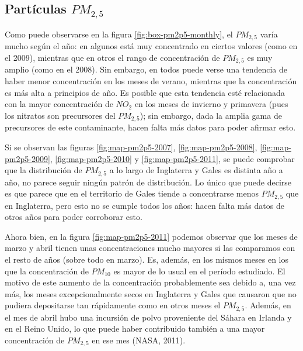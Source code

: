 \documentclass[12pt]{article}
\begin{document}
\subsection*{Partículas \textbf{\texorpdfstring{$PM_{2,5}$}{PM2,5}}}
%

Como puede observarse en la figura \ref{fig:box-pm2p5-monthly}, el $PM_{2,5}$ varía mucho según el año: en algunos está muy concentrado en ciertos valores (como en el 2009), mientras que en otros el rango de concentración de $PM_{2,5}$ es muy amplio (como en el 2008). Sin embargo, en todos puede verse una tendencia de haber menor concentración en los meses de verano, mientras que la concentración es más alta a principios de año. Es posible que esta tendencia esté relacionada con la mayor concentración de $NO_{2}$ en los meses de invierno y primavera (pues los nitratos son precursores del $PM_{2,5}$); sin embargo, dada la amplia gama de precursores de este contaminante, hacen falta más datos para poder afirmar esto.

Si se observan las figuras \ref{fig:map-pm2p5-2007}, \ref{fig:map-pm2p5-2008}, \ref{fig:map-pm2p5-2009}, \ref{fig:map-pm2p5-2010} y \ref{fig:map-pm2p5-2011}, se puede comprobar que la distribución de $PM_{2,5}$ a lo largo de Inglaterra y Gales es distinta año a año, no parece seguir ningún patrón de distribución. Lo único que puede decirse es que parece que en el territorio de Gales tiende a concentrarse menos $PM_{2,5}$ que en Inglaterra, pero esto no se cumple todos los años: hacen falta más datos de otros años para poder corroborar esto.

Ahora bien, en la figura \ref{fig:map-pm2p5-2011} podemos observar que los meses de marzo y abril tienen unas concentraciones mucho mayores si las comparamos con el resto de años (sobre todo en marzo). Es, además, en los mismos meses en los que la concentración de $PM_{10}$ es mayor de lo usual en el período estudiado. El motivo de este aumento de la concentración probablemente sea debido a, una vez más, los meses excepcionalmente secos en Inglaterra y Gales que causaron que no pudiera depositarse tan rápidamente como en otros meses el $PM_{2,5}$. Además, en el mes de abril hubo una incursión de polvo proveniente del Sáhara en Irlanda y en el Reino Unido, lo que puede haber contribuido también a una mayor concentración de $PM_{2,5}$ en ese mes (NASA, 2011).
\end{document}
